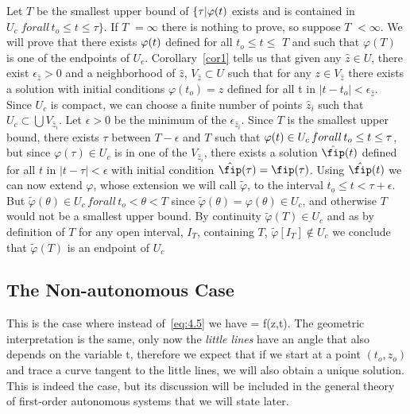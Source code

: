 Let $T$ be the smallest upper bound of $\{\tau | \mbox{$\varphi (t)$} $ exists and is 
contained in $U_c \; for all \, t_o \leq t \leq \tau \}$.
If $T$ $= \infty $ there is nothing to prove, so suppose $T$ $<
\infty $. We will prove that there exists $\mbox{$\varphi (t)$} $ defined for all $t_o \leq 
t \leq $ $T$ and such that $\varphi (T) $ is one of the endpoints of $U_c $.
Corollary~\ref{cor1} tells us that given any $\hat z \in U$, there exist
$\epsilon_{\hat z} > 0 $ and a neighborhood of $\hat z$, $V_{\hat z} \subset U$ such
that for any $z \in V_{\hat z} $ there exists a solution with
initial conditions $\varphi (t_o) = z$ defined for all t in
$\left| t - t_o \right| < \epsilon_{\hat z} $.
Since $U_c $ is compact, we can choose a finite number of points
${\hat z_i }$ such that $U_c \subset \bigcup V_{\hat z_i}$. 
Let $\epsilon > 0 $ be the minimum of the $\epsilon_{\hat z_i} $.
Since $T$ is the smallest upper bound, there exists $\tau $ between $T -
\epsilon $ and $T$ such that $\mbox{$\varphi (t)$} \in U_c \, for all \, t_o \leq t \leq \tau $, 
but since 
$\varphi(\tau ) \in U_c $ 
is in one of the $V_{\hat z_i } $, there exists
a solution $\hat{\fip}(t) $ defined for all $t$ in 
$\left| t - \tau \right|
< \epsilon $ 
with initial condition 
$\hat{\fip}(\tau) = \fip(\tau) $.
Using $\hat{\fip}(t) $ we can now extend $\varphi $, whose extension 
we will call $\tilde\varphi $, to the interval $t_o \leq t < \tau + \epsilon $.
But 
$\tilde\varphi (\theta) \in U_c \, for all \, t_o < \theta <T$ 
since 
$\tilde\varphi(\theta) = \varphi(\theta) \in U_c$, 
and otherwise $T$ would not
be a smallest upper bound. By continuity $\tilde\varphi(T)
\in U_c$ and as by definition of $T$ for any open interval, $I_T $,
containing $T$,  $\tilde\varphi[I_T] \not\in U_c $ we conclude that 
$\tilde\varphi(T) $ is an endpoint of $U_c$ \epru

\subsection{The Non-autonomous Case}

This is the case where instead of~\ref{eq:4.5} we have 
\beq 
{} = f(z,t).
\eeq
The geometric interpretation is the same, only now the {\sl
little lines} have an angle that also depends on the variable t,
therefore we expect that if we start at a point $(t_o,z_o)$ and 
trace a curve tangent to the little lines, we will also obtain a unique
solution. This is indeed the case, but its discussion will be 
included in the general theory of first-order autonomous systems
that we will state later.

